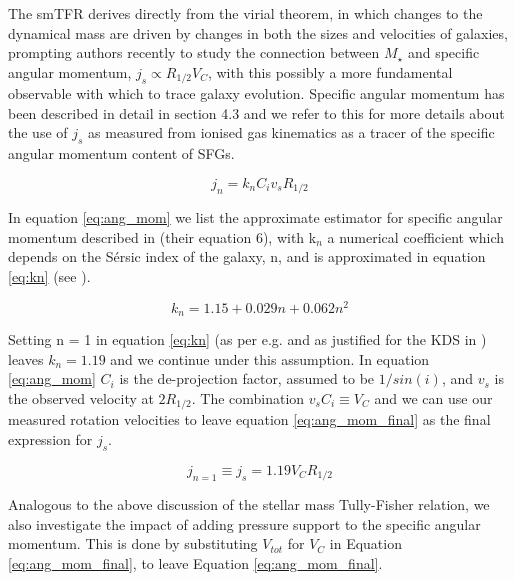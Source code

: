 \documentclass[fleqn,usenatbib]{mnras}
\newcommand{\Sers}{S\'{e}rsic }
\begin{document}
The smTFR derives directly from the virial theorem, in which changes to the dynamical mass are driven by changes in both the sizes and velocities of galaxies, prompting authors recently \citep[e.g.][]{Cortese2016,Contini2015a,Burkert2016a,Harrison2017,Swinbank2017} to study the connection between $M_{\star}$ and specific angular momentum, $j_{s} \propto R_{1/2}V_{C}$, with this possibly a more fundamental observable with which to trace galaxy evolution.
Specific angular momentum has been described in detail in \cite{Harrison2017} section 4.3 and we refer to this for more details about the use of $j_{s}$ as measured from ionised gas kinematics as a tracer of the specific angular momentum content of SFGs.

\begin{equation}\label{eq:ang_mom}
   j_{n} = k_{n}C_{i}v_{s}R_{1/2}
\end{equation}

\noindent
In equation \ref{eq:ang_mom} we list the approximate estimator for specific angular momentum described in \cite{Romanowsky2012} (their equation 6), with k$_{n}$ a numerical coefficient which depends on the \Sers index of the galaxy, n, and is approximated in equation \ref{eq:kn} (see \cite{Romanowsky2012}).

\begin{equation}\label{eq:kn}
   k_{n} = 1.15 + 0.029n + 0.062n^{2}
\end{equation}

\noindent
Setting n = 1 in equation \ref{eq:kn} (as per e.g. \citealt{Harrison2017,Swinbank2017} and as justified for the KDS in \cite{Turner2017}) leaves $k_{n} = 1.19$ and we continue under this assumption.
In equation \ref{eq:ang_mom} $C_{i}$ is the de-projection factor, assumed to be $1/sin(i)$, and $v_{s}$ is the observed velocity at $2R_{1/2}$.
The combination $v_{s}C_{i} \equiv V_{C}$ and we can use our measured rotation velocities to leave equation \ref{eq:ang_mom_final} as the final expression for $j_{s}$. 

\begin{equation}\label{eq:ang_mom_final}
   j_{n=1} \equiv j_{s} = 1.19V_{C}R_{1/2}
\end{equation}

\noindent
Analogous to the above discussion of the stellar mass Tully-Fisher relation, we also investigate the impact of adding pressure support to the specific angular momentum.
This is done by substituting $V_{tot}$ for $V_{C}$ in Equation \ref{eq:ang_mom_final}, to leave Equation \ref{eq:ang_mom_final}.
\end{document}
